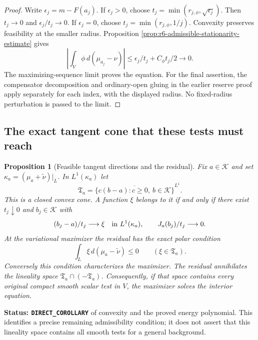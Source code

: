 \documentclass[11pt,a4paper]{article}
\numberwithin{equation}{section}
\newtheorem{proposition}[theorem]{Proposition}
\theoremstyle{definition}
\theoremstyle{remark}
\begin{document}
\begin{proof}
Write $\epsilon_j=m-F(a_j)$. If $\epsilon_j>0$, choose
$t_j=\min(r_{j,\phi},\sqrt{\epsilon_j})$. Then
$t_j\to0$ and $\epsilon_j/t_j\to0$. If $\epsilon_j=0$,
choose $t_j=\min(r_{j,\phi},1/j)$. Convexity preserves feasibility
at the smaller radius. Proposition
\ref{prop:r6-admissible-stationarity-estimate} gives
\[
 \left|\int_V\phi\,d(\mu_{a_j}-\nu)\right|
               \le\epsilon_j/t_j+C_\phi t_j/2\longrightarrow0.
\]
The maximizing-sequence limit proves the equation. For the final
assertion, the compensator decomposition and ordinary-open gluing in
the earlier reserve proof apply separately for each index, with the
displayed radius. No fixed-radius perturbation is passed to the limit.
\end{proof}

\subsection{The exact tangent cone that these tests must reach}

\begin{proposition}[Feasible tangent directions and the residual]
\label{prop:r6-energy-feasible-tangent-cone}
Fix $a\in\mathscr K$ and set
$\kappa_a=(\mu_a+\widetilde\nu)|_L$. In $L^1(\kappa_a)$ let
\[
 \mathfrak T_a=\overline{\{c(b-a):c\ge0,\ b\in\mathscr K\}}^{L^1}.
\]
This is a closed convex cone. A function $\xi$ belongs to it if and
only if there exist $t_j\downarrow0$ and $b_j\in\mathscr K$ with
\[
 (b_j-a)/t_j\longrightarrow\xi\quad\hbox{in }L^1(\kappa_a),
                       \qquad J_a(b_j)/t_j\longrightarrow0.
\]
At the variational maximizer the residual has the exact polar condition
\[
             \int_L\xi\,d(\mu_a-\widetilde\nu)\le0
                                    \qquad(\xi\in\mathfrak T_a).
\]
Conversely this condition characterizes the maximizer. The residual
annihilates the lineality space $\mathfrak T_a\cap(-\mathfrak T_a)$.
Consequently, if that space contains every original compact smooth
scalar test in $V$, the maximizer solves the interior equation.
\end{proposition}

\noindent\textbf{Status: \texttt{DIRECT\_COROLLARY}} of convexity and
the proved energy polynomial. This identifies a precise remaining
admissibility condition; it does not assert that this lineality space
contains all smooth tests for a general background.
\end{document}
